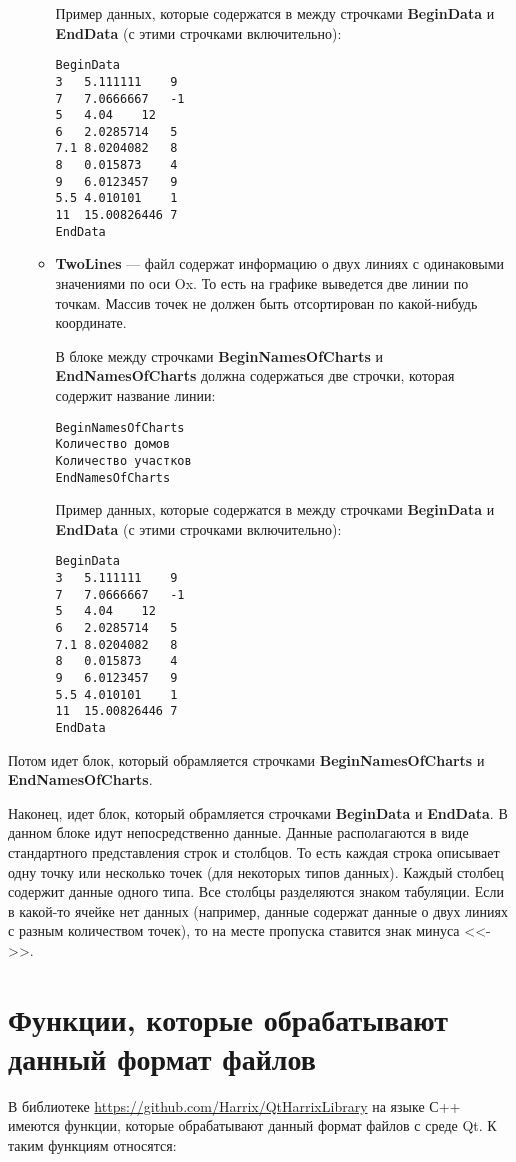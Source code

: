 \documentclass[a4paper,12pt]{article}
\begin{document}
\begin{itemize}
\begin{itemize}
Пример данных, которые содержатся в между строчками \textbf{BeginData} и \textbf{EndData} (с этими строчками включительно):
\begin{lstlisting}[label=Line03_5,caption=Для Line ]
BeginData
3	5.111111	9
7	7.0666667	-1
5	4.04	12
6	2.0285714	5
7.1	8.0204082	8
8	0.015873	4
9	6.0123457	9
5.5	4.010101	1
11	15.00826446	7
EndData
\end{lstlisting}

\item \textbf{TwoLines} --- файл содержат информацию о двух линиях с одинаковыми значениями по оси Ox. То есть на графике выведется две линии по точкам. Массив точек не должен быть отсортирован по какой-нибудь координате.

В блоке между строчками \textbf{BeginNamesOfCharts} и \textbf{EndNamesOfCharts} должна содержаться две строчки, которая содержит название линии:
\begin{lstlisting}[label=Line03_4,caption=Для Line ]
BeginNamesOfCharts
Количество домов
Количество участков
EndNamesOfCharts
\end{lstlisting}

Пример данных, которые содержатся в между строчками \textbf{BeginData} и \textbf{EndData} (с этими строчками включительно):
\begin{lstlisting}[label=Line03_5,caption=Для Line ]
BeginData
3	5.111111	9
7	7.0666667	-1
5	4.04	12
6	2.0285714	5
7.1	8.0204082	8
8	0.015873	4
9	6.0123457	9
5.5	4.010101	1
11	15.00826446	7
EndData
\end{lstlisting}

\end{itemize}

\end{itemize}

Потом идет блок, который обрамляется строчками \textbf{BeginNamesOfCharts} и \textbf{EndNamesOfCharts}.

Наконец, идет блок, который обрамляется строчками \textbf{BeginData} и \textbf{EndData}. В данном блоке идут непосредственно данные. Данные располагаются в виде стандартного представления строк и столбцов. То есть каждая строка описывает одну точку или несколько точек (для некоторых типов данных). Каждый столбец содержит данные одного типа. Все столбцы разделяются знаком табуляции. Если в какой-то ячейке нет данных (например, данные содержат данные о двух линиях с разным количеством точек), то на месте пропуска ставится знак минуса <<->>.

\section{Функции, которые обрабатывают данный формат файлов}

В библиотеке \href {https://github.com/Harrix/QtHarrixLibrary} {https://github.com/Harrix/QtHarrixLibrary} на языке С++ имеются функции, которые обрабатывают данный формат файлов с среде Qt. К таким функциям относятся:
\end{document}
